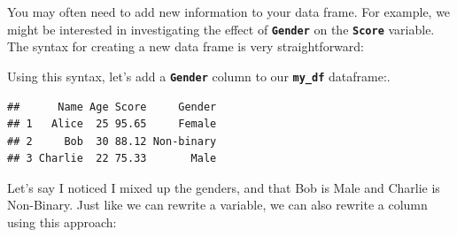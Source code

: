 \documentclass[
]{book}
\newenvironment{Shaded}{\begin{snugshade}}{\end{snugshade}}
\newcommand{\CommentTok}[1]{\textcolor[rgb]{0.56,0.35,0.01}{\textit{#1}}}
\newcommand{\FunctionTok}[1]{\textcolor[rgb]{0.13,0.29,0.53}{\textbf{#1}}}
\newcommand{\NormalTok}[1]{#1}
\newcommand{\OtherTok}[1]{\textcolor[rgb]{0.56,0.35,0.01}{#1}}
\newcommand{\SpecialCharTok}[1]{\textcolor[rgb]{0.81,0.36,0.00}{\textbf{#1}}}
\newcommand{\StringTok}[1]{\textcolor[rgb]{0.31,0.60,0.02}{#1}}
\begin{document}
You may often need to add new information to your data frame. For example, we might be interested in investigating the effect of \textbf{\texttt{Gender}} on the \textbf{\texttt{Score}} variable. The syntax for creating a new data frame is very straightforward:

\begin{Shaded}
\end{Shaded}

Using this syntax, let's add a \textbf{\texttt{Gender}} column to our \textbf{\texttt{my\_df}} dataframe:.

\begin{Shaded}
\end{Shaded}

\begin{verbatim}
##      Name Age Score     Gender
## 1   Alice  25 95.65     Female
## 2     Bob  30 88.12 Non-binary
## 3 Charlie  22 75.33       Male
\end{verbatim}

Let's say I noticed I mixed up the genders, and that Bob is Male and Charlie is Non-Binary. Just like we can rewrite a variable, we can also rewrite a column using this approach:

\begin{Shaded}
\end{Shaded}
\end{document}
